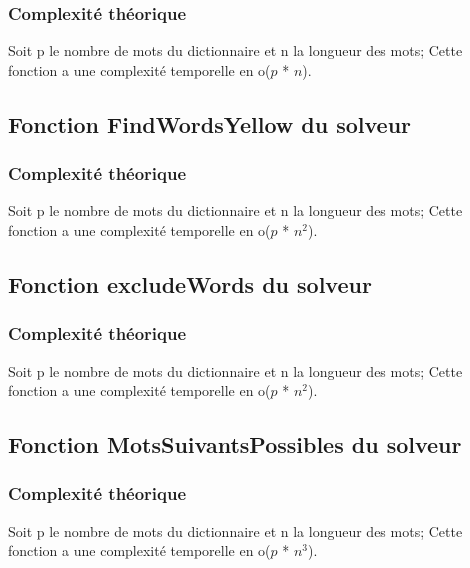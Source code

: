 \subsubsection{Complexité théorique}
Soit p le nombre de mots du dictionnaire et n la longueur des mots; Cette fonction a une complexité temporelle en o($p$ * $n$).

\subsection{Fonction FindWordsYellow du solveur}
\subsubsection{Complexité théorique}
Soit p le nombre de mots du dictionnaire et n la longueur des mots; Cette fonction a une complexité temporelle en o($p$ * $n^2$).

\subsection{Fonction excludeWords du solveur}
\subsubsection{Complexité théorique}
Soit p le nombre de mots du dictionnaire et n la longueur des mots; Cette fonction a une complexité temporelle en o($p$ * $n^2$).

\subsection{Fonction MotsSuivantsPossibles du solveur}
\subsubsection{Complexité théorique}
Soit p le nombre de mots du dictionnaire et n la longueur des mots; Cette fonction a une complexité temporelle en o($p$ * $n^3$).